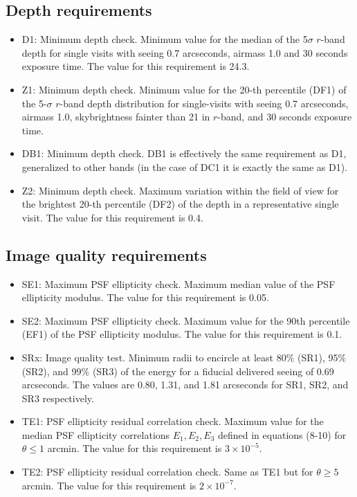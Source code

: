 \documentclass[\docopts]{\docclass}
\begin{document}
\subsection{Depth requirements}
\begin{itemize}
\item D1: Minimum depth check. Minimum value for the median of the 5$\sigma$ $r$-band depth for single visits with seeing 0.7 arcseconds, airmass 1.0 and 30 seconds exposure time. The value for this requirement is 24.3.
\item Z1: Minimum depth check. Minimum value for the 20-th percentile (DF1) of the 5-$\sigma$ $r$-band depth distribution for single-visits with seeing 0.7 arcseconds, airmass 1.0, skybrightness fainter than 21 in $r$-band, and 30 seconds exposure time.
\item DB1: Minimum depth check. DB1 is effectively the same requirement as D1, generalized to other bands (in the case of DC1 it is exactly the same as D1).
\item Z2: Minimum depth check. Maximum variation within the field of view for the brightest 20-th percentile (DF2) of the depth in a representative single visit. The value for this requirement is 0.4.
\end{itemize}

\subsection{Image quality requirements}
\begin{itemize}

\item SE1: Maximum PSF ellipticity check. Maximum median value of the PSF ellipticity modulus. The value for this requirement is 0.05.
\item SE2: Maximum PSF ellipticity check. Maximum value for the 90th percentile (EF1) of the PSF ellipticity modulus. The value for this requirement is 0.1.
\item SRx: Image quality test. Minimum radii to encircle at least 80\% (SR1), 95\% (SR2), and 99\% (SR3) of the energy for a fiducial delivered seeing of 0.69 arcseconds. The values are 0.80, 1.31, and 1.81 arcseconds for SR1, SR2, and SR3 respectively.
\item TE1: PSF ellipticity residual correlation check. Maximum value for the median PSF ellipticity correlations $E_{1}, E_{2}, E_{3}$ defined in equations (8-10) for $\theta \leq 1$ arcmin. The value for this requirement is $3 \times 10^{-5}$.
\item TE2: PSF ellipticity residual correlation check. Same as TE1 but for $\theta \geq 5$ arcmin. The value for this requirement is $2 \times 10^{-7}$. 
\end{itemize}
\end{document}
